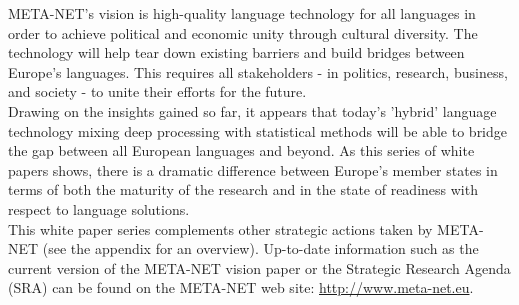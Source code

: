\begin{multicols}{2}

META-NET’s vision is high-quality language
technology for all languages in order to achieve political and
economic unity through cultural diversity. The technology will help
tear down existing barriers and build bridges between Europe’s
languages. This requires all stakeholders - in politics, research,
business, and society - to unite their efforts for the future.\\
Drawing on the insights gained so far, it appears that today’s
'hybrid' language technology mixing deep processing with statistical
methods will be able to bridge the gap between all European languages
and beyond. As this series of white papers shows, there is a dramatic
difference between Europe’s member states in terms of both the maturity of the research and in the state of readiness with respect to language solutions.\\
This white paper series complements other strategic actions taken by
META-NET (see the appendix for an overview). Up-to-date information
such as the current version of the META-NET vision paper \cite{Vision}
or the Strategic Research Agenda (SRA) can be found on the META-NET
web site: \url{http://www.meta-net.eu}.

\end{multicols}
\clearpage
{}
